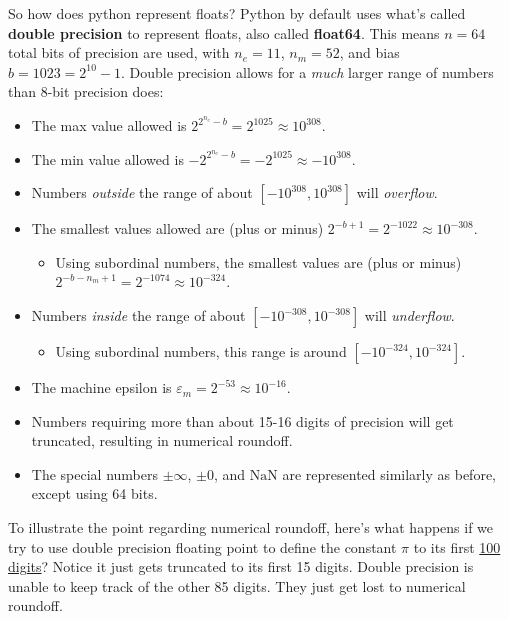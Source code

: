 \documentclass[
  letterpaper,
  DIV=11,
  numbers=noendperiod]{scrreprt}
\providecommand{\tightlist}{%
  \setlength{\itemsep}{0pt}\setlength{\parskip}{0pt}}\usepackage{longtable,booktabs,array}
\begin{document}
So how does python represent floats? Python by default uses what's
called \textbf{double precision} to represent floats, also called
\textbf{float64}. This means \(n=64\) total bits of precision are used,
with \(n_e=11\), \(n_m=52\), and bias \(b=1023=2^{10}-1\). Double
precision allows for a \emph{much} larger range of numbers than 8-bit
precision does:

\begin{itemize}
\tightlist
\item
  The max value allowed is
  \(2^{2^{n_e}-b} = 2^{1025} \approx 10^{308}\).
\item
  The min value allowed is
  \(-2^{2^{n_e}-b} = -2^{1025} \approx -10^{308}\).
\item
  Numbers \emph{outside} the range of about \([-10^{308}, 10^{308}]\)
  will \emph{overflow}.
\item
  The smallest values allowed are (plus or minus)
  \(2^{-b+1} = 2^{-1022} \approx 10^{-308}\).

  \begin{itemize}
  \tightlist
  \item
    Using subordinal numbers, the smallest values are (plus or minus)
    \(2^{-b-n_m+1} = 2^{-1074} \approx 10^{-324}\).
  \end{itemize}
\item
  Numbers \emph{inside} the range of about \([-10^{-308}, 10^{-308}]\)
  will \emph{underflow}.

  \begin{itemize}
  \tightlist
  \item
    Using subordinal numbers, this range is around
    \([-10^{-324}, 10^{-324}]\).
  \end{itemize}
\item
  The machine epsilon is \(\varepsilon_m = 2^{-53} \approx 10^{-16}\).
\item
  Numbers requiring more than about 15-16 digits of precision will get
  truncated, resulting in numerical roundoff.
\item
  The special numbers \(\pm \infty\), \(\pm 0\), and \(\text{NaN}\) are
  represented similarly as before, except using 64 bits.
\end{itemize}

To illustrate the point regarding numerical roundoff, here's what
happens if we try to use double precision floating point to define the
constant \(\pi\) to its first
\href{https://www.wolframalpha.com/input?i=pi+to+100+digits}{100
digits}? Notice it just gets truncated to its first 15 digits. Double
precision is unable to keep track of the other 85 digits. They just get
lost to numerical roundoff.
\end{document}
